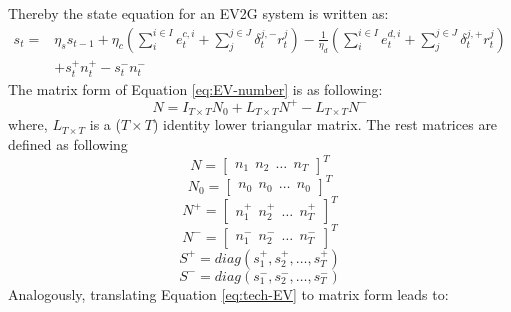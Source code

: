 Thereby the state equation for an EV2G system is written as:
\begin{equation}
\label{eq:tech-EV}
\begin{aligned}
s_t = & \eta_s s_{t-1} + \eta_c (\sum_{i}^{i \in I} e_t^{c,i} + \sum_{j}^{j \in J}\delta_t^{j,-}r_t^j)- \frac{1}{\eta_d} (\sum_{i}^{i \in I} e_t^{d,i} + \sum_{j}^{j \in J}\delta_t^{j,+}r_t^j) \\
&+ s_t^+ n_t^+ - s_t^- n_t^-
\end{aligned}
\end{equation} 
\newline
The matrix form of Equation \eqref{eq:EV-number} is as following:
\begin{equation}
\label{eq:EV-number-M}
N = I_{T \times T} N_0 + L_{T \times T} N^+ -L_{T \times T} N^- 
\end{equation}
where, $L_{T \times T}$ is a ($T \times T$) identity lower triangular matrix. The rest matrices are defined as following
\begin{equation*}
N = \begin{bmatrix}
n_1~~n_2~~\dots~~n_T
\end{bmatrix}^T
\end{equation*}
\begin{equation*}
N_0 = \begin{bmatrix}
n_0~~n_0~~\dots~~n_0
\end{bmatrix}^T
\end{equation*}
\begin{equation*}
N^+ = \begin{bmatrix}
n_1^+~~n_2^+~~\dots~~n_T^+
\end{bmatrix}^T
\end{equation*}
\begin{equation*}
N^- = \begin{bmatrix}
n_1^-~~n_2^-~~\dots~~n_T^-
\end{bmatrix}^T
\end{equation*}
\begin{equation*}
S^+ = diag(s_1^+, s_2^+, \dots, s_T^+
)
\end{equation*}
\begin{equation*}
S^- = diag(s_1^-, s_2^-, \dots, s_T^-)
\end{equation*}
\newline
Analogously, translating Equation \eqref{eq:tech-EV} to matrix form leads to:

